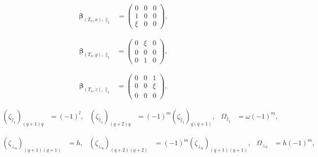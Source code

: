 \begin{align}
\bm{\beta}_{\left(T_{n},x\right),\parallel_{1}}
    &=
        \begin{pmatrix}
            0   & 0 & 0 \\
            1   & 0 & 0 \\
            \xi & 0 & 0
        \end{pmatrix}
,
\end{align}

\begin{align}
\bm{\beta}_{\left(T_{n},y\right),\parallel_{1}}
    &=
        \begin{pmatrix}
            0 & \xi & 0 \\
            0 & 0   & 0 \\
            0 & 1   & 0
        \end{pmatrix}
,
\end{align}


\begin{align}
\bm{\beta}_{\left(T_{n},z\right),\parallel_{1}}
    &=
        \begin{pmatrix}
            0 & 0 & 1   \\
            0 & 0 & \xi \\
            0 & 0 & 0
        \end{pmatrix}
,
\end{align}

\begin{align}
\left(\zeta_{\parallel_{1}}\right)_{\left(q+1\right)q}
    &=
        \left(-1\right)^{l}
,&
\left(\zeta_{\parallel_{1}}\right)_{\left(q+2\right)q}
    &=
        \left(-1\right)^{m}
        \left(\zeta_{\parallel_{1}}\right)_{q\left(q+1\right)}
,&
\Omega_{\parallel_{1}}
    &=
        \omega\left(-1\right)^{m}
,
\end{align}





\pagebreak





\begin{align}
\left(\zeta_{\perp_{0}}\right)_{\left(q+1\right)\left(q+1\right)}
    &=
        h
,&
\left(\zeta_{\perp_{0}}\right)_{\left(q+2\right)\left(q+2\right)}
    &=
        \left(-1\right)^{m}
        \left(\zeta_{\perp_{0}}\right)_{\left(q+1\right)\left(q+1\right)}
,&
\Omega_{\perp_{0}}
    &=
        h\left(-1\right)^{m}
,
\end{align}
    



